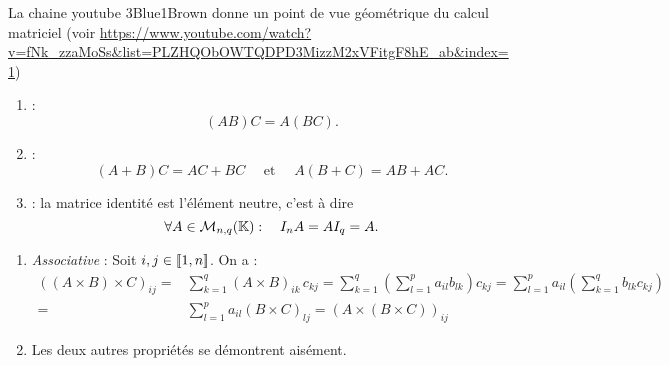 \documentclass{book}
\begin{document}
\begin{Exemple}
La chaine  youtube 3Blue1Brown donne un point de vue géométrique du calcul matriciel (voir \url{https://www.youtube.com/watch?v=fNk_zzaMoSs&list=PLZHQObOWTQDPD3MizzM2xVFitgF8hE_ab&index=1}) 
\end{Exemple}

\begin{Proposition}[Propriétés]
\begin{enumerate}
\item
   : $$ (A  B) C = A  (B C).$$
\item
   :  $$  ( A + B) C = A C +  B C\quad\text{ et }\quad A (B+ C) = AB + AC.$$
\item
   : la matrice identité est l'élément neutre, c'est à dire  
 $$\forall A \in   \mathcal{M}_{n,q}(\mathbb{K}) :\quad I_n A =A I_q = A.$$
\end{enumerate}
\end{Proposition}
\begin{Demonstration}
\begin{enumerate}
\item \textit{Associative} : Soit $i,j\in\mathopen\lbrack\!\lbrack1,n \mathclose\rbrack\!\rbrack$. On a :
$$
\begin{aligned}
\left((A \times B) \times C\right)_{ij}=&\sum_{k=1}^q (A \times B)_{ik}\,c_{kj}=\sum_{k=1}^q \left(\sum_{l=1}^p a_{il}b_{lk}\right) c_{kj}=\sum_{l=1}^p  a_{il}\left(\sum_{k=1}^q b_{lk} c_{kj}\right)\\
=&\sum_{l=1}^p a_{il}(B \times C)_{lj}=\left(A \times (B \times C)\right)_{ij}
\end{aligned}$$
\item Les deux autres propriétés se démontrent aisément. 
\end{enumerate}
\end{Demonstration}
\end{document}
